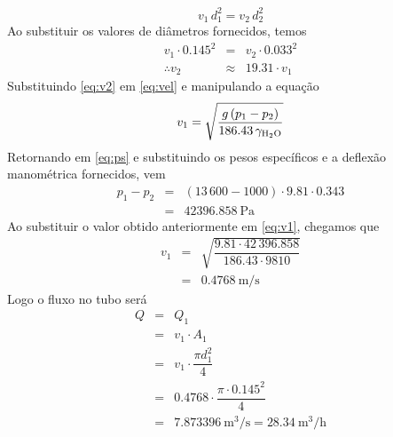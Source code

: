 \documentclass[a4paper, 12pt, brazilian]{article}
\begin{document}
	\begin{equation}
		v_{1}\,d_{1}^{2}=v_{2}\,d_{2}^{2}
	\end{equation}
	Ao substituir os valores de diâmetros fornecidos, temos
	\begin{eqnarray}
		v_{1}\cdot 0.145^{2}&=&v_{2}\cdot 0.033^{2}\\
		\therefore v_{2}&\approx&19.31\cdot v_{1}\label{eq:v2}
	\end{eqnarray}
	Substituindo \eqref{eq:v2} em \eqref{eq:vel} e manipulando a equação
	\begin{equation}
		\label{eq:v1}
		v_{1}=\sqrt{\dfrac{g\,(p_{1}-p_{2})}{186.43\,\gamma_{\ce{H2O}}}}
	\end{equation}
	Retornando em \eqref{eq:ps} e substituindo os pesos específicos e a deflexão manométrica fornecidos, vem
	\begin{eqnarray}
		p_{1}-p_{2}&=&(13\,600-1000)\cdot 9.81\cdot 0.343\\
				   &=&\SI{42396.858}{\pascal}
	\end{eqnarray}
	Ao substituir o valor obtido anteriormente em \eqref{eq:v1}, chegamos que
	\begin{eqnarray}
		v_{1}&=&\sqrt{\dfrac{9.81\cdot 42\,396.858}{186.43\cdot 9810}}\\
		 	 &=&\SI{0.4768}{\meter/\second}
	\end{eqnarray}
	Logo o fluxo no tubo será
	\begin{eqnarray}
		Q&=&Q_{1}\\
		 &=&v_{1}\cdot A_{1}\\
		 &=&v_{1}\cdot\dfrac{\pi d_{1}^{2}}{4}\\
		 &=&0.4768\cdot\dfrac{\pi\cdot 0.145^{2}}{4}\\
		 &=&\SI{7.873396}{\meter^{3}/\second}=\SI{28.34}{\meter^{3}/\hour}
	\end{eqnarray}
\end{document}
